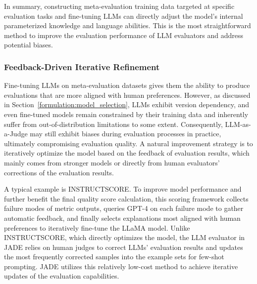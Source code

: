 In summary, constructing meta-evaluation training data targeted at specific evaluation tasks and fine-tuning LLMs can directly adjust the model's internal parameterized knowledge and language abilities. This is the most straightforward method to improve the evaluation performance of LLM evaluators and address potential biases.


\subsubsection{\textbf{Feedback-Driven Iterative Refinement}}
\label{subsubsec:iterate_models}

Fine-tuning LLMs on meta-evaluation datasets gives them the ability to produce evaluations that are more aligned with human preferences.
However, as discussed in Section~\ref{formulation:model_selection}, LLMs exhibit version dependency, and even fine-tuned models remain constrained by their training data and inherently suffer from out-of-distribution limitations to some extent. Consequently, LLM-as-a-Judge may still exhibit biases during evaluation processes in practice, ultimately compromising evaluation quality.
A natural improvement strategy is to iteratively optimize the model based on the feedback of evaluation results, which mainly comes from stronger models or directly from human evaluators' corrections of the evaluation results. 

A typical example is INSTRUCTSCORE\cite{xu2023instructscore}. To improve model performance and further benefit the final quality score calculation, this scoring framework collects failure modes of metric outputs, queries GPT-4 on each failure mode to gather automatic feedback, and finally selects explanations most aligned with human preferences to iteratively fine-tune the LLaMA model. Unlike INSTRUCTSCORE, which directly optimizes the model, the LLM evaluator in JADE\cite{zhang2023jade} relies on human judges to correct LLMs' evaluation results and updates the most frequently corrected samples into the example sets for few-shot prompting. JADE utilizes this relatively low-cost method to achieve iterative updates of the evaluation capabilities. 

